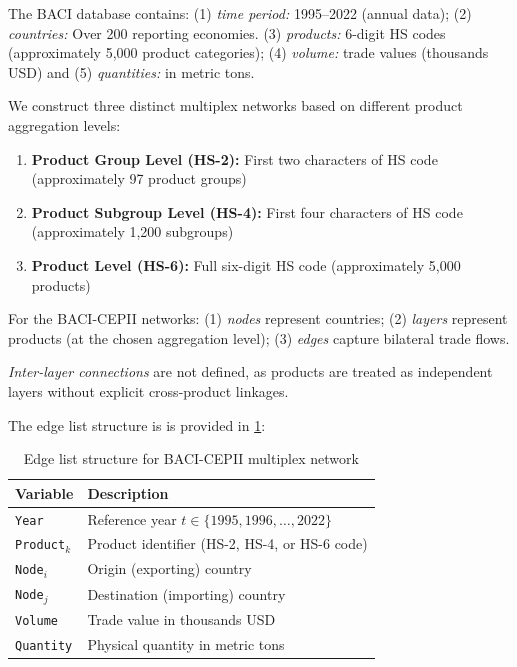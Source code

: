 \documentclass[preprint, 3p,
authoryear]{elsarticle} %
\begin{document}
The BACI database contains: (1) \emph{time period:} 1995--2022 (annual
data); (2) \emph{countries:} Over 200 reporting economies. (3)
\emph{products:} 6-digit HS codes (approximately 5,000 product
categories); (4) \emph{volume:} trade values (thousands USD) and (5)
\emph{quantities:} in metric tons.

We construct three distinct multiplex networks based on different
product aggregation levels:

\begin{enumerate}
    \item \textbf{Product Group Level (HS-2):} First two characters of HS code (approximately 97 product groups)
    \item \textbf{Product Subgroup Level (HS-4):} First four characters of HS code (approximately 1,200 subgroups)
    \item \textbf{Product Level (HS-6):} Full six-digit HS code (approximately 5,000 products)
\end{enumerate}

For the BACI-CEPII networks: (1) \emph{nodes} represent countries; (2)
\emph{layers} represent products (at the chosen aggregation level); (3)
\emph{edges} capture bilateral trade flows.

\emph{Inter-layer connections} are not defined, as products are treated
as independent layers without explicit cross-product linkages.

The edge list structure is is provided in \ref{tab:baci_edgelist}:

\begin{table}[ht]
\centering
\caption{Edge list structure for  BACI-CEPII multiplex network}
\label{tab:baci_edgelist}
\begin{tabular}{@{}lp{9cm}@{}}
\toprule
\textbf{Variable} & \textbf{Description} \\
\midrule
\texttt{Year} & Reference year $t \in \{1995, 1996, \ldots, 2022\}$ \\
\texttt{Product$_k$} & Product identifier (HS-2, HS-4, or HS-6 code) \\
\texttt{Node$_i$} & Origin (exporting) country \\
\texttt{Node$_j$} & Destination (importing) country \\
\texttt{Volume} & Trade value in thousands USD \\
\texttt{Quantity} & Physical quantity in metric tons \\
\bottomrule
\end{tabular}
\end{table}
\end{document}

